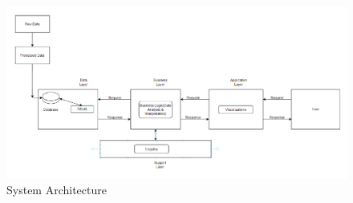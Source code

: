 \label{sec:architecture}
\begin{figure}
	\centering
	\includegraphics[width=1.2\linewidth]{images/system-architecture.png}
	\caption{System Architecture}
\end{figure} 